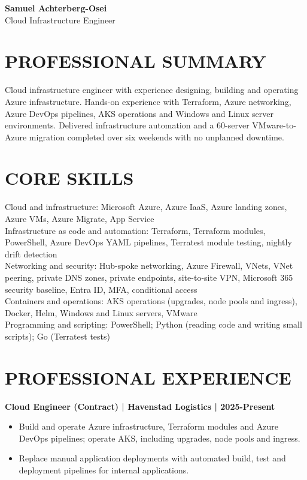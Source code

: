 \documentclass[11pt,a4paper]{article}
\begin{document}
{\Huge\bfseries\color{primarycolor} Samuel Achterberg-Osei}\\[0.25em]
{\large\color{accentcolor} Cloud Infrastructure Engineer}

\section*{PROFESSIONAL SUMMARY}
Cloud infrastructure engineer with experience designing, building and operating Azure infrastructure. Hands-on experience with Terraform, Azure networking, Azure DevOps pipelines, AKS operations and Windows and Linux server environments. Delivered infrastructure automation and a 60-server VMware-to-Azure migration completed over six weekends with no unplanned downtime.

\section*{CORE SKILLS}
Cloud and infrastructure: Microsoft Azure, Azure IaaS, Azure landing zones, Azure VMs, Azure Migrate, App Service\\
Infrastructure as code and automation: Terraform, Terraform modules, PowerShell, Azure DevOps YAML pipelines, Terratest module testing, nightly drift detection\\
Networking and security: Hub-spoke networking, Azure Firewall, VNets, VNet peering, private DNS zones, private endpoints, site-to-site VPN, Microsoft 365 security baseline, Entra ID, MFA, conditional access\\
Containers and operations: AKS operations (upgrades, node pools and ingress), Docker, Helm, Windows and Linux servers, VMware\\
Programming and scripting: PowerShell; Python (reading code and writing small scripts); Go (Terratest tests)

\section*{PROFESSIONAL EXPERIENCE}
\textbf{Cloud Engineer (Contract) | Havenstad Logistics | 2025-Present}
\begin{itemize}
\item Build and operate Azure infrastructure, Terraform modules and Azure DevOps pipelines; operate AKS, including upgrades, node pools and ingress.
\item Replace manual application deployments with automated build, test and deployment pipelines for internal applications.
\end{itemize}
\end{document}
